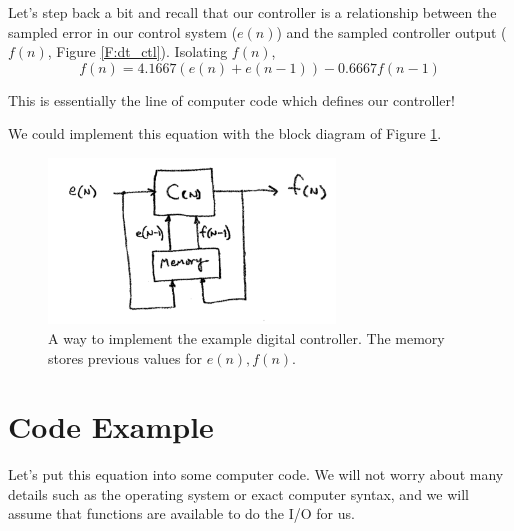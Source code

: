 Let's step back a bit and recall that our controller is a relationship between the sampled error in our control system ($e(n)$) and the sampled controller output ($f(n)$, Figure \ref{F:dt_ctl}).  Isolating $f(n)$,	%
\[
f(n) = 4.1667 (e(n) + e(n-1))-0.6667f(n-1)
\]

This is essentially the line of computer code which defines our controller!  	%


 We could implement this equation with the block diagram of Figure \ref{F:DigitalControl}.	%

\begin{figure}\centering
\includegraphics[width=3.0in]{figs11/dig_ctl_bda.png}
\caption{A way to implement the example digital controller.  The memory stores previous values for $e(n), f(n)$. }\label{F:DigitalControl}
\end{figure}



\section{Code Example}

 Let's put this equation into some computer code.  We will not worry about many details such as the operating system or exact computer syntax, and we will assume that functions are available to do the I/O for us.  	%

